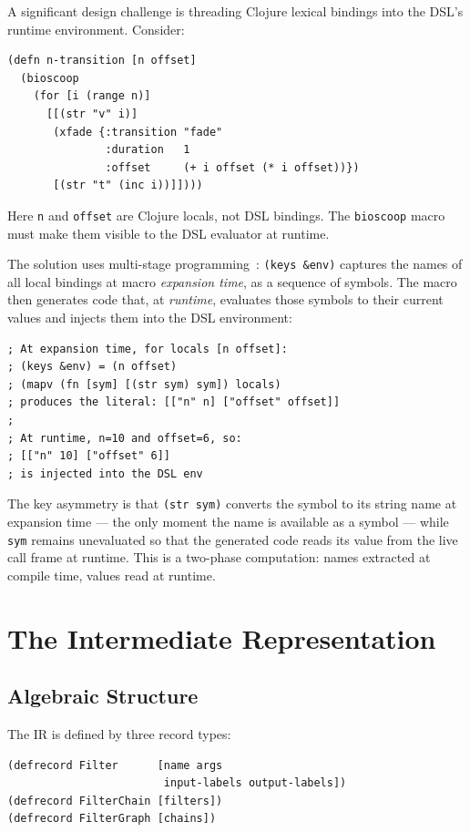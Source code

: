 \documentclass[conference]{IEEEtran}
\begin{document}
A significant design challenge is threading Clojure lexical bindings into the DSL's runtime environment. Consider:

\begin{lstlisting}[caption={Parameterized iteration with lexical scope}]
(defn n-transition [n offset]
  (bioscoop
    (for [i (range n)]
      [[(str "v" i)]
       (xfade {:transition "fade"
               :duration   1
               :offset     (+ i offset (* i offset))})
       [(str "t" (inc i))]])))
\end{lstlisting}

Here \texttt{n} and \texttt{offset} are Clojure locals, not DSL bindings. The \texttt{bioscoop} macro must make them visible to the DSL evaluator at runtime.

The solution uses multi-stage programming~\cite{taha}: \texttt{(keys \&env)} captures the names of all local bindings at macro \emph{expansion time}, as a sequence of symbols. The macro then generates code that, at \emph{runtime}, evaluates those symbols to their current values and injects them into the DSL environment:

\begin{lstlisting}[caption={The locals injection mechanism}]
; At expansion time, for locals [n offset]:
; (keys &env) = (n offset)
; (mapv (fn [sym] [(str sym) sym]) locals)
; produces the literal: [["n" n] ["offset" offset]]
;
; At runtime, n=10 and offset=6, so:
; [["n" 10] ["offset" 6]]
; is injected into the DSL env
\end{lstlisting}

The key asymmetry is that \texttt{(str sym)} converts the symbol to its string name at expansion time --- the only moment the name is available as a symbol --- while \texttt{sym} remains unevaluated so that the generated code reads its value from the live call frame at runtime. This is a two-phase computation: names extracted at compile time, values read at runtime.

\section{The Intermediate Representation}

\subsection{Algebraic Structure}

The IR is defined by three record types:

\begin{lstlisting}[caption={IR record definitions}]
(defrecord Filter      [name args
                        input-labels output-labels])
(defrecord FilterChain [filters])
(defrecord FilterGraph [chains])
\end{lstlisting}
\end{document}
